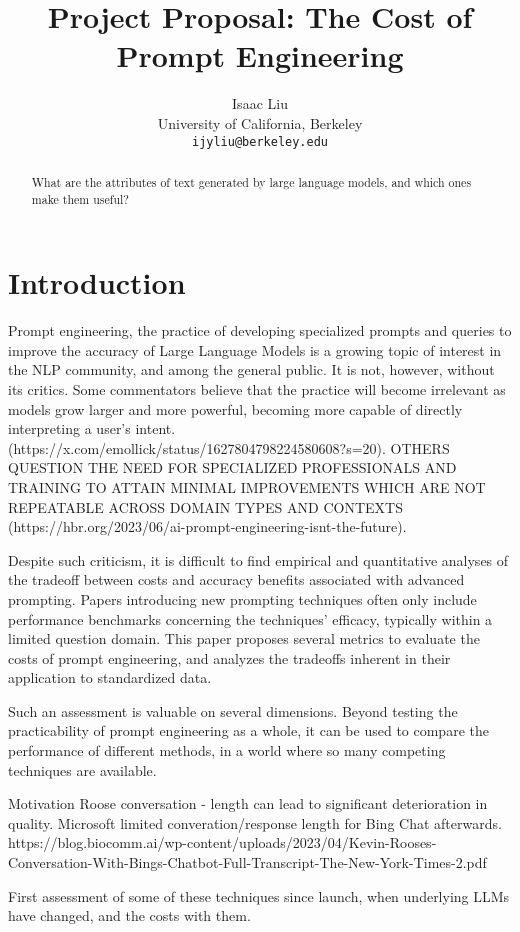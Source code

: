 \documentclass[11pt]{article}
\title{Project Proposal: The Cost of Prompt Engineering}
\author{Isaac Liu \\
  University of California, Berkeley \\
  \texttt{ijyliu@berkeley.edu}}
\begin{document}
\maketitle
\begin{abstract}
What are the attributes of text generated by large language models, and which ones make them useful?
\end{abstract}

\section{Introduction}

Prompt engineering, the practice of developing specialized prompts and queries to improve the accuracy of Large Language Models is a growing topic of interest in the NLP community, and among the general public. It is not, however, without its critics. Some commentators believe that the practice will become irrelevant as models grow larger and more powerful, becoming more capable of directly interpreting a user's intent. (https://x.com/emollick/status/1627804798224580608?s=20). OTHERS QUESTION THE NEED FOR SPECIALIZED PROFESSIONALS AND TRAINING TO ATTAIN MINIMAL IMPROVEMENTS WHICH ARE NOT REPEATABLE ACROSS DOMAIN TYPES AND CONTEXTS (https://hbr.org/2023/06/ai-prompt-engineering-isnt-the-future). 

Despite such criticism, it is difficult to find empirical and quantitative analyses of the tradeoff between costs and accuracy benefits associated with advanced prompting. Papers introducing new prompting techniques often only include performance benchmarks concerning the techniques' efficacy, typically within a limited question domain. This paper proposes several metrics to evaluate the costs of prompt engineering, and analyzes the tradeoffs inherent in their application to standardized data.

Such an assessment is valuable on several dimensions. Beyond testing the practicability of prompt engineering as a whole, it can be used to compare the performance of different methods, in a world where so many competing techniques are available. 

Motivation
Roose conversation - length can lead to significant deterioration in quality. Microsoft limited converation/response length for Bing Chat afterwards.
https://blog.biocomm.ai/wp-content/uploads/2023/04/Kevin-Rooses-Conversation-With-Bings-Chatbot-Full-Transcript-The-New-York-Times-2.pdf

First assessment of some of these techniques since launch, when underlying LLMs have changed, and the costs with them.
\end{document}
